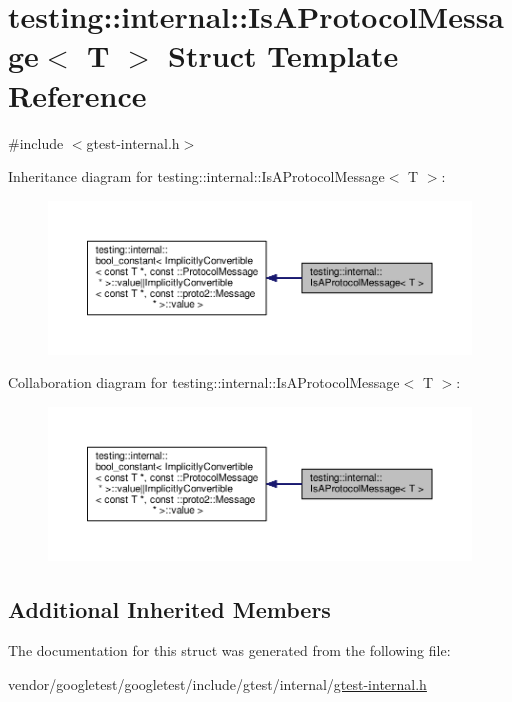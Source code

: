 \hypertarget{structtesting_1_1internal_1_1IsAProtocolMessage}{}\section{testing\+:\+:internal\+:\+:Is\+A\+Protocol\+Message$<$ T $>$ Struct Template Reference}
\label{structtesting_1_1internal_1_1IsAProtocolMessage}


{\ttfamily \#include $<$gtest-\/internal.\+h$>$}



Inheritance diagram for testing\+:\+:internal\+:\+:Is\+A\+Protocol\+Message$<$ T $>$\+:\nopagebreak
\begin{figure}[H]
\begin{center}
\leavevmode
\includegraphics[width=350pt]{structtesting_1_1internal_1_1IsAProtocolMessage__inherit__graph}
\end{center}
\end{figure}


Collaboration diagram for testing\+:\+:internal\+:\+:Is\+A\+Protocol\+Message$<$ T $>$\+:\nopagebreak
\begin{figure}[H]
\begin{center}
\leavevmode
\includegraphics[width=350pt]{structtesting_1_1internal_1_1IsAProtocolMessage__coll__graph}
\end{center}
\end{figure}
\subsection*{Additional Inherited Members}


The documentation for this struct was generated from the following file\+:\begin{DoxyCompactItemize}
\item 
vendor/googletest/googletest/include/gtest/internal/\hyperlink{gtest-internal_8h}{gtest-\/internal.\+h}\end{DoxyCompactItemize}
